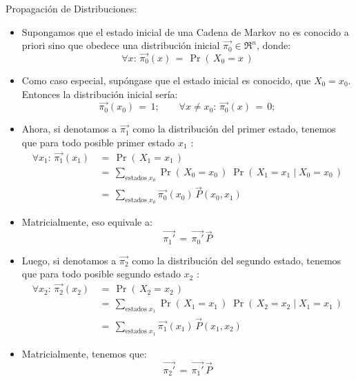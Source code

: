 \documentclass[ 10pt, xcolor = dvipsnames]{beamer}
\begin{document}
\begin{frame}[allowframebreaks]
\frametitle{\insertsection}

Propagaci\'on de Distribuciones: 
\begin{itemize}
\item Supongamos que el estado inicial de una Cadena de Markov no es conocido \linebreak a priori sino que obedece una distribuci\'on inicial $\vec{\pi_0} \in \Re^n$, donde: 
\[
\forall x \colon \, \vec{\pi_0}(x) \, = \, \Pr( \, X_0 = x \, )
\]
\item Como caso especial, sup\'ongase que el estado inicial es conocido, \eg \linebreak que $X_0 = x_0$. Entonces la distribuci\'on inicial ser\'ia: 
\[
\vec{\pi_0}(x_0) \, = \, 1; \qquad
\forall x \neq x_0 \colon \, \vec{\pi_0}(x) \, = \, 0;
\]
\end{itemize}
\framebreak

\begin{itemize}
\item Ahora, si denotamos a $\vec{\pi_1}$ como la distribuci\'on del primer estado, \linebreak tenemos que para todo posible primer estado $x_1$ :
\begin{align*}
\forall x_1 \colon \, \vec{\pi_1}(x_1) \, 
& = \, \Pr( \, X_1 = x_1 \, ) \\[1ex]
& = \, \sum_{\text{estados } x_0} \Pr( \, X_0 = x_0 \, ) \; \Pr( \, X_1 = x_1 \mid X_0 = x_0 \, ) \\[1ex]
& = \, \sum_{\text{estados } x_0} \vec{\pi_0}(x_0) \, \vec{P}(x_0,x_1)
\end{align*}
\item Matricialmente, eso equivale a: 
\[
\vec{\pi_1'} \, = \, \vec{\pi_0'} \, \vec{P}
\]
\end{itemize}
\framebreak

\begin{itemize}
\item Luego, si denotamos a $\vec{\pi_2}$ como la distribuci\'on del segundo estado, \linebreak tenemos que para todo posible segundo estado $x_2$ :
\begin{align*}
\forall x_2 \colon \, \vec{\pi_2}(x_2) \,
& = \, \Pr( \, X_2 = x_2 \, ) \\[1ex]
& = \, \sum_{\text{estados } x_1} \Pr( \, X_1 = x_1 \, ) \; \Pr( \, X_2 = x_2 \mid X_1 = x_1 \, ) \\[1ex]
& = \, \sum_{\text{estados } x_1} \vec{\pi_1}(x_1) \, \vec{P}(x_1,x_2)
\end{align*}
\item Matricialmente, tenemos que: 
\[
\vec{\pi_2'} \, = \, \vec{\pi_1'} \, \vec{P}
\]
\end{itemize}
\framebreak


\end{frame}
\end{document}
